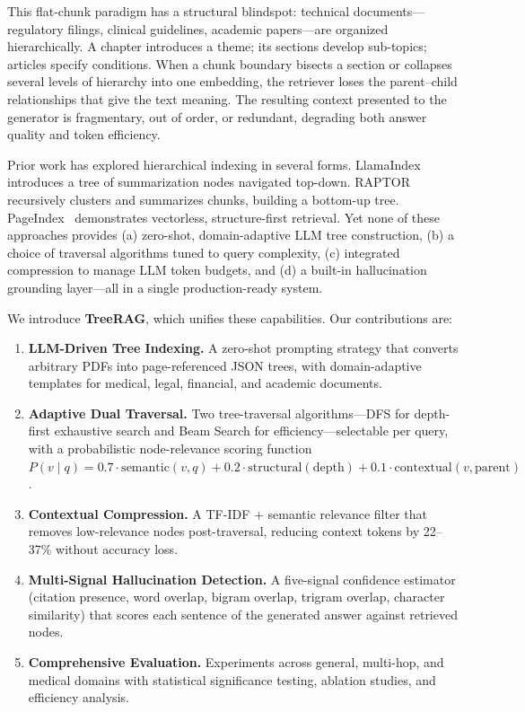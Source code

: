 \documentclass[sigconf,review,anonymous]{acmart}
\begin{document}
This flat-chunk paradigm has a structural blindspot: technical
documents---regulatory filings, clinical guidelines, academic papers---are
organized hierarchically. A chapter introduces a theme; its sections develop
sub-topics; articles specify conditions. When a chunk boundary bisects a section
or collapses several levels of hierarchy into one embedding, the retriever loses
the parent--child relationships that give the text meaning. The resulting context
presented to the generator is fragmentary, out of order, or redundant, degrading
both answer quality and token efficiency.

Prior work has explored hierarchical indexing in several forms.
LlamaIndex~\cite{liu2022llamaindex} introduces a tree of summarization nodes
navigated top-down. RAPTOR~\cite{sarthi2024raptor} recursively clusters and
summarizes chunks, building a bottom-up tree.
PageIndex~\cite{vectifyai2023pageindex} demonstrates vectorless, structure-first
retrieval. Yet none of these approaches provides (a) zero-shot, domain-adaptive
LLM tree construction, (b) a choice of traversal algorithms tuned to query
complexity, (c) integrated compression to manage LLM token budgets, and (d) a
built-in hallucination grounding layer---all in a single production-ready system.

We introduce \textbf{TreeRAG}, which unifies these capabilities. Our
contributions are:
\begin{enumerate}
\item \textbf{LLM-Driven Tree Indexing.} A zero-shot prompting strategy that
converts arbitrary PDFs into page-referenced JSON trees, with domain-adaptive
templates for medical, legal, financial, and academic documents.
\item \textbf{Adaptive Dual Traversal.} Two tree-traversal algorithms---DFS for
depth-first exhaustive search and Beam Search for efficiency---selectable per
query, with a probabilistic node-relevance scoring function
$P(v\mid q)=0.7\cdot\mathrm{semantic}(v,q)+0.2\cdot\mathrm{structural}(\mathrm{depth})+0.1\cdot\mathrm{contextual}(v,\mathrm{parent})$.
\item \textbf{Contextual Compression.} A TF-IDF + semantic relevance filter that
removes low-relevance nodes post-traversal, reducing context tokens by 22--37\%
without accuracy loss.
\item \textbf{Multi-Signal Hallucination Detection.} A five-signal confidence
estimator (citation presence, word overlap, bigram overlap, trigram overlap,
character similarity) that scores each sentence of the generated answer against
retrieved nodes.
\item \textbf{Comprehensive Evaluation.} Experiments across general, multi-hop,
and medical domains with statistical significance testing, ablation studies, and
efficiency analysis.
\end{enumerate}
\end{document}
